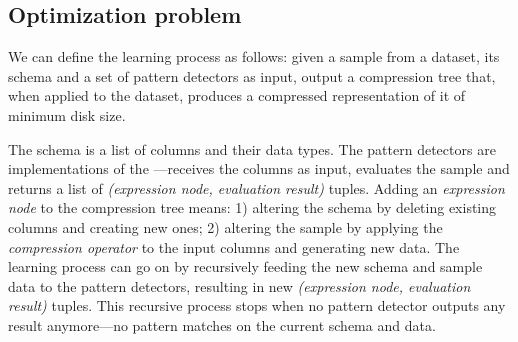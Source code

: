 \subsection{Optimization problem}
\label{subsec:learningprocess:optimizationproblem}





% 

We can define the learning process as follows: given a sample from a dataset, its schema and a set of pattern detectors as input, output a compression tree that, when applied to the dataset, produces a compressed representation of it of minimum disk size.

The schema is a list of columns and their data types. The pattern detectors are implementations of the ---receives the columns as input, evaluates the sample and returns a list of \textit{(expression node, evaluation result)} tuples. Adding an \textit{expression node} to the compression tree means: 1) altering the schema by deleting existing columns and creating new ones; 2) altering the sample by applying the \textit{compression operator} to the input columns and generating new data. The learning process can go on by recursively feeding the new schema and sample data to the pattern detectors, resulting in new \textit{(expression node, evaluation result)} tuples. This recursive process stops when no pattern detector outputs any result anymore---no pattern matches on the current schema and data.

